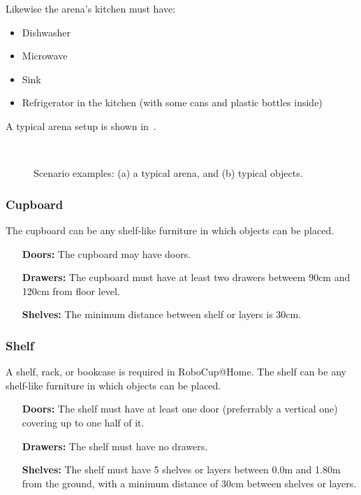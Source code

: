 Likewise the arena's kitchen must have:
\begin{itemize}
	\item Dishwasher
	\item Microwave
	\item Sink
	\item Refrigerator in the kitchen (with some cans and plastic bottles inside)
\end{itemize}

A typical arena setup is shown in~.

\begin{figure}[tbp]
	\centering
	 ~
	\caption{Scenario examples: (a) a typical arena, and (b) typical objects.}
	\label{fig:arena}
\end{figure}


\subsubsection{Cupboard}
The cupboard can be any shelf-like furniture in which objects can be placed.
\begin{itemize}
	\item[\textbf{Doors:}] The cupboard may have doors.
	\item[\textbf{Drawers:}] The cupboard must have at least two drawers betweem 90cm and 120cm from floor level.
	\item[\textbf{Shelves:}] The minimum distance between shelf or layers is 30cm.
\end{itemize}

\subsubsection{Shelf}
A shelf, rack, or bookcase is required in RoboCup@Home.
The shelf can be any shelf-like furniture in which objects can be placed.
\begin{itemize}
	\item[\textbf{Doors:}] The shelf must have at least one door (preferrably a vertical one) covering up to one half of it.
	\item[\textbf{Drawers:}] The shelf must have no drawers.
	\item[\textbf{Shelves:}] The shelf must have 5 shelves or layers between 0.0m and 1.80m from the ground, with a minimum distance of 30cm between shelves or layers.
\end{itemize}


